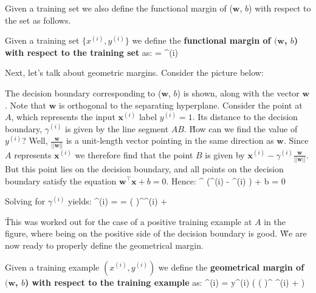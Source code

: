 Given a training set we also define the functional margin of ($\boldsymbol{w}$, $b$) with respect to the set as follows.

 Given a training set $\{ x^{(i)}, y^{(i)} \}$ we define the \textbf{functional margin
of $(\boldsymbol{w}$, $b$) with respect to the training set} as:
\bse
{\hat{\gamma}} = \min {\hat{\gamma}}^{(i)}
\ese
\ed

Next, let's talk about geometric margins. Consider the picture below:


The decision boundary corresponding to ($\boldsymbol{w}$, $b$) is shown, along with the vector $\boldsymbol{w}$. Note
that $\boldsymbol{w}$ is orthogonal to the separating hyperplane. Consider the point at $A$, which represents the
input $\boldsymbol{x}^{(i)}$ label $y^{(i)} = 1$. Its distance to the decision boundary, $\gamma^{(i)}$ is given by
the line segment $AB$. \v

How can we find the value of $y^{(i)}$? Well, $\frac{\boldsymbol{w}}{||\boldsymbol{w}||}$ is a unit-length vector
pointing in the same direction as $\boldsymbol{w}$. Since $A$ represents $\boldsymbol{x}^{(i)}$ we therefore find
that the point $B$ is given by $\boldsymbol{x}^{(i)} - \gamma^{(i)} \frac{\boldsymbol{w}}{||\boldsymbol{w}||}$. But
this point lies on the decision boundary, and all points on the decision boundary satisfy the equation
$\boldsymbol{w}^{\intercal} \boldsymbol{x} + b = 0$. Hence:
\bse
{}^{\intercal} \Big(^{(i)} - \gamma^{(i)} \Big) + b
= 0
\ese

Solving for $\gamma^{(i)}$ yields:
\bse
\gamma^{(i)} = 
= \left( \right)^{\intercal}^{(i)} + 
\ese

\v

This was worked out for the case of a positive training example at $A$ in the figure, where being on the positive
side of the decision boundary is good. \v

We are now ready to properly define the geometrical margin.

 Given a training example $(x^{(i)}, y^{(i)})$ we define the
\textbf{geometrical margin of $(\boldsymbol{w}$, $b$) with respect to the training example} as:
\bse
\gamma^{(i)} = y^{(i)} \left( \left(  \right)^{\intercal} ^{(i)}
+  \right)
\ese
\ed

